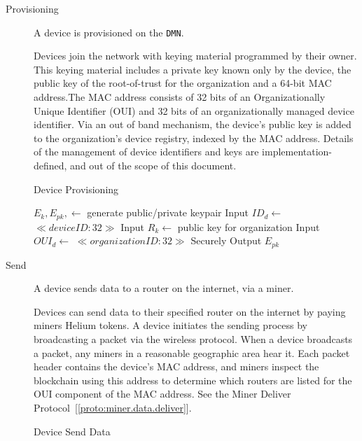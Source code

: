 \documentclass[10pt, nonatbib, nocopyrightspace, reprint]{sigplanconf}
\begin{document}
\begin{description}
  \item [Provisioning] A device is provisioned on the \verb|DMN|.

    Devices join the network with keying material programmed by their owner. This keying material includes a private key known only by the device, the public key of the root-of-trust for the organization and a 64-bit MAC address.The MAC address consists of 32 bits of an Organizationally Unique Identifier (OUI) and 32 bits of an organizationally managed device identifier. Via an out of band mechanism, the device's public key is added to the organization's device registry, indexed by the MAC address. Details of the management of device identifiers and keys are implementation-defined, and out of the scope of this document.

    \begin{algorithm}[!htb]
      \DontPrintSemicolon
      \caption{Device Provisioning}\label{proto:device.provision}

       {
        $E_k, E_{pk}, \leftarrow $ generate public/private keypair \;
        Input ${ID}_d \leftarrow $ $ \ll device ID:32 \gg $ \;
        Input $R_k \leftarrow $ public key for organization \;
        Input ${OUI}_d \leftarrow $ $ \ll organization ID:32 \gg $ \;
        \BlankLine
        Securely  \;
        \BlankLine
        Output $E_{pk}$ \;
      }
    \end{algorithm}
    \FloatBarrier

  \item [Send] A device sends data to a router on the internet, via a miner.

    Devices can send data to their specified router on the internet by paying miners Helium tokens.
    A device initiates the sending process by broadcasting a packet via the wireless protocol. When a device broadcasts a packet, any miners in a reasonable geographic area hear it. Each packet header contains the device's MAC address, and miners inspect the blockchain using this address to determine which routers are listed for the OUI component of the MAC address. See the Miner Deliver Protocol~[\ref{proto:miner.data.deliver}].

    \begin{algorithm}[!htb]
      \DontPrintSemicolon
      \caption{Device Send Data}\label{proto:device.data.send}


\end{algorithm}
\end{description}
\end{document}
